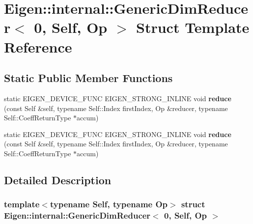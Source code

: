 \hypertarget{struct_eigen_1_1internal_1_1_generic_dim_reducer_3_010_00_01_self_00_01_op_01_4}{}\section{Eigen\+:\+:internal\+:\+:Generic\+Dim\+Reducer$<$ 0, Self, Op $>$ Struct Template Reference}
\label{struct_eigen_1_1internal_1_1_generic_dim_reducer_3_010_00_01_self_00_01_op_01_4}
\subsection*{Static Public Member Functions}
\begin{DoxyCompactItemize}
\item 
\mbox{\label{struct_eigen_1_1internal_1_1_generic_dim_reducer_3_010_00_01_self_00_01_op_01_4_ad564f83b46be650440afed7611a43075}} 
static E\+I\+G\+E\+N\+\_\+\+D\+E\+V\+I\+C\+E\+\_\+\+F\+U\+NC E\+I\+G\+E\+N\+\_\+\+S\+T\+R\+O\+N\+G\+\_\+\+I\+N\+L\+I\+NE void {\bfseries reduce} (const Self \&self, typename Self\+::\+Index first\+Index, Op \&reducer, typename Self\+::\+Coeff\+Return\+Type $\ast$accum)
\item 
\mbox{\label{struct_eigen_1_1internal_1_1_generic_dim_reducer_3_010_00_01_self_00_01_op_01_4_ad564f83b46be650440afed7611a43075}} 
static E\+I\+G\+E\+N\+\_\+\+D\+E\+V\+I\+C\+E\+\_\+\+F\+U\+NC E\+I\+G\+E\+N\+\_\+\+S\+T\+R\+O\+N\+G\+\_\+\+I\+N\+L\+I\+NE void {\bfseries reduce} (const Self \&self, typename Self\+::\+Index first\+Index, Op \&reducer, typename Self\+::\+Coeff\+Return\+Type $\ast$accum)
\end{DoxyCompactItemize}


\subsection{Detailed Description}
\subsubsection*{template$<$typename Self, typename Op$>$\newline
struct Eigen\+::internal\+::\+Generic\+Dim\+Reducer$<$ 0, Self, Op $>$}



